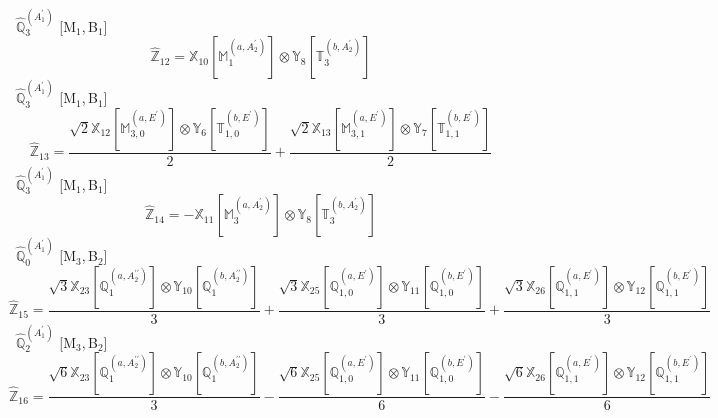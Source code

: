 \documentclass[fleqn,10pt,landscape]{article}
\begin{document}
\begin{itemize}
\begin{dmath*}
\end{dmath*}
\vspace{4mm}
\noindent {} $\,\,\,\hat{\mathbb{Q}}_{3}^{(A_{1}^{\prime})}$ [M$_{1}$,\,B$_{1}$]
\begin{dmath*}
\hat{\mathbb{Z}}_{12}=\mathbb{X}_{10}[\mathbb{M}_{1}^{(a,A_{2}^{\prime})}] \otimes\mathbb{Y}_{8}[\mathbb{T}_{3}^{(b,A_{2}^{\prime})}]
\end{dmath*}
\vspace{4mm}
\noindent {} $\,\,\,\hat{\mathbb{Q}}_{3}^{(A_{1}^{\prime})}$ [M$_{1}$,\,B$_{1}$]
\begin{dmath*}
\hat{\mathbb{Z}}_{13}=\frac{\sqrt{2} \mathbb{X}_{12}[\mathbb{M}_{3,0}^{(a,E^{\prime})}] \otimes\mathbb{Y}_{6}[\mathbb{T}_{1,0}^{(b,E^{\prime})}]}{2} + \frac{\sqrt{2} \mathbb{X}_{13}[\mathbb{M}_{3,1}^{(a,E^{\prime})}] \otimes\mathbb{Y}_{7}[\mathbb{T}_{1,1}^{(b,E^{\prime})}]}{2}
\end{dmath*}
\vspace{4mm}
\noindent {} $\,\,\,\hat{\mathbb{Q}}_{3}^{(A_{1}^{\prime})}$ [M$_{1}$,\,B$_{1}$]
\begin{dmath*}
\hat{\mathbb{Z}}_{14}=- \mathbb{X}_{11}[\mathbb{M}_{3}^{(a,A_{2}^{\prime})}] \otimes\mathbb{Y}_{8}[\mathbb{T}_{3}^{(b,A_{2}^{\prime})}]
\end{dmath*}
\vspace{4mm}
\noindent {} $\,\,\,\hat{\mathbb{Q}}_{0}^{(A_{1}^{\prime})}$ [M$_{3}$,\,B$_{2}$]
\begin{dmath*}
\hat{\mathbb{Z}}_{15}=\frac{\sqrt{3} \mathbb{X}_{23}[\mathbb{Q}_{1}^{(a,A_{2}^{\prime\prime})}] \otimes\mathbb{Y}_{10}[\mathbb{Q}_{1}^{(b,A_{2}^{\prime\prime})}]}{3} + \frac{\sqrt{3} \mathbb{X}_{25}[\mathbb{Q}_{1,0}^{(a,E^{\prime})}] \otimes\mathbb{Y}_{11}[\mathbb{Q}_{1,0}^{(b,E^{\prime})}]}{3} + \frac{\sqrt{3} \mathbb{X}_{26}[\mathbb{Q}_{1,1}^{(a,E^{\prime})}] \otimes\mathbb{Y}_{12}[\mathbb{Q}_{1,1}^{(b,E^{\prime})}]}{3}
\end{dmath*}
\vspace{4mm}
\noindent {} $\,\,\,\hat{\mathbb{Q}}_{2}^{(A_{1}^{\prime})}$ [M$_{3}$,\,B$_{2}$]
\begin{dmath*}
\hat{\mathbb{Z}}_{16}=\frac{\sqrt{6} \mathbb{X}_{23}[\mathbb{Q}_{1}^{(a,A_{2}^{\prime\prime})}] \otimes\mathbb{Y}_{10}[\mathbb{Q}_{1}^{(b,A_{2}^{\prime\prime})}]}{3} - \frac{\sqrt{6} \mathbb{X}_{25}[\mathbb{Q}_{1,0}^{(a,E^{\prime})}] \otimes\mathbb{Y}_{11}[\mathbb{Q}_{1,0}^{(b,E^{\prime})}]}{6} - \frac{\sqrt{6} \mathbb{X}_{26}[\mathbb{Q}_{1,1}^{(a,E^{\prime})}] \otimes\mathbb{Y}_{12}[\mathbb{Q}_{1,1}^{(b,E^{\prime})}]}{6}

\end{dmath*}
\end{itemize}
\end{document}
